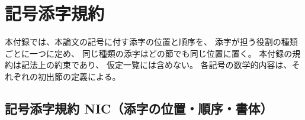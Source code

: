 \section{記号添字規約}
\label{app:notation}

本付録では、本論文の記号に付す添字の位置と順序を、
添字が担う役割の種類ごとに一つに定め、
同じ種類の添字はどの節でも同じ位置に置く。
本付録の規約は記法上の約束であり、
仮定一覧には含めない。
各記号の数学的内容は、それぞれの初出節の定義による。

\subsection*{記号添字規約 NIC（添字の位置・順序・書体）}
\label{conv:NIC}

